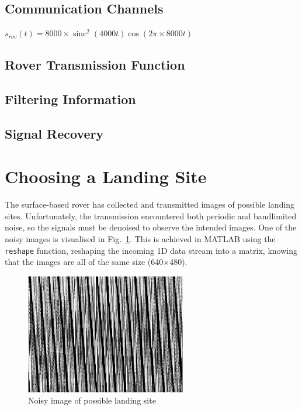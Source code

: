 \documentclass[12pt]{article}
\DeclareMathOperator{\sinc}{sinc}
\begin{document}
\subsection*{Communication Channels}
\begin{math}
    s_{rov}(t) = 8000 \times \sinc^2(4000t)\cos(2\pi \times 8000t)
\end{math}
\subsection*{Rover Transmission Function}
\subsection*{Filtering Information}
\subsection*{Signal Recovery}
\pagebreak

%
%
\section{Choosing a Landing Site}

The surface-based rover has collected and transmitted images of possible
landing sites. Unfortunately, the transmission encountered both periodic and
bandlimited noise, so the signals must be denoised to observe the intended
images. One of the noisy images is visualised in Fig.~\ref{fig:p2-noisy}. This
is achieved in MATLAB using the \verb+reshape+ function, reshaping the incoming
1D data stream into a matrix, knowing that the images are all of the same size
(640$\times$480).

\begin{figure}[ht]
    \centering
    \includegraphics[width=7cm]{figures/p2-noisy.png}
    \caption{Noisy image of possible landing site\label{fig:p2-noisy}}
\end{figure}
\end{document}
